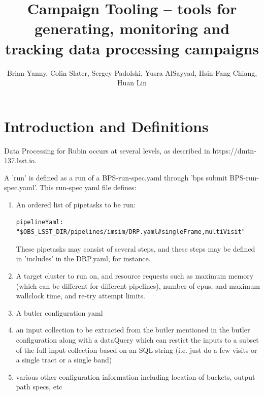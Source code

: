\documentclass[DM,authoryear,toc]{lsstdoc}
\title{Campaign Tooling -- tools for generating, monitoring and tracking data processing campaigns}
\author{%
Brian Yanny, Colin Slater, Sergey Padolski, Yusra AlSayyad, Hsin-Fang Chiang, Huan Lin
}
\date{\vcsDate}
\begin{document}
\maketitle


\section{Introduction and Definitions}

Data Processing for Rubin occurs at several levels,
as described in https://dmtn-137.lsst.io. 


A 'run' is defined as a run of a BPS-run-spec.yaml through 'bps submit
BPS-run-spec.yaml'.
This run-spec yaml file defines:
\begin{enumerate}

\item An ordered list of pipetasks to be run: 
\begin{verbatim}
pipelineYaml: 
"$OBS_LSST_DIR/pipelines/imsim/DRP.yaml#singleFrame,multiVisit"
\end{verbatim}
These pipetasks may consist of several steps, and these steps may be defined
in 'includes' in the DRP.yaml, for instance.

\item A target cluster to run on, and resource requests such as 
maximum memory (which can be different for different pipelines), number of cpus,
and maximum wallclock time, and re-try attempt limits.

\item A butler configuration yaml

\item an input collection to be extracted from the butler mentioned in
the butler configuration along with a dataQuery which can restict the inputs
to a subset of the full input collection based on 
an SQL string (i.e. just do a few visits or a single tract
or a single band)

\item various other configuration information including location of 
buckets, output path specs, etc

\end{enumerate}
\end{document}
